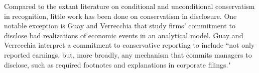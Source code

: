 \documentclass[letterpaper,12pt]{article}
\begin{document}
\begin{spacing}{1.5}
Compared to the extant literature on conditional and unconditional conservatism in recognition, little work has been done on conservatism in disclosure. One notable exception is Guay and Verrecchia \citeyear{guayConservativeDisclosure2018} that study firms' commitment to disclose bad realizations of economic events in an analytical model. Guay and Verrecchia \citeyear[p. 73]{guayConservativeDisclosure2018} interpret a commitment to conservative reporting to include ``not only reported earnings, but, more broadly, any mechanism that commits managers to disclose, such as required footnotes and explanations in corporate filings."
\begin{comment}
	As \citeA[p. 243]{kothariManagersWithholdBad2009} state:
	\begin{adjustwidth}{1cm}{1cm}
	\begin{singlespace}
	\textit{Considerable research examines conservative} recognition \textit{in accounting in the United States and internationally (Basu [1997], Ball, Kothari, and Robin [2000], McNichols [1988]). However, there is little systematic evidence to suggest conservatism in firms’} disclosure \textit{practices, with the notable exception of disclosure of bad news to mitigate litigation risk.}
	\end{singlespace}
	\end{adjustwidth}
	In a recent analytical work, \citeA[pp. 73-74]{guayConservativeDisclosure2018} have expressed similar opinions:
	\begin{adjustwidth}{1cm}{1cm}
	\begin{singlespace}
	\textit{By way of an analogy, 20 years ago, much of the accounting literature on transparent financial disclosure emphasized constructs such as earnings timeliness, high-quality accruals, and asset/liability recognition. Today, scholars study a plethora of additional financial disclosure mechanisms, including management forecasts, conference calls, management discussion and analysis (MD\&A) disclosure, press releases, and social media outlets. A commitment to timely disclosure of bad news need not come exclusively through financial statement recognition, and we believe that a broader view of conservative disclosure will offer new paths forward for a literature that has struggled to develop theories to explain the efficiency of timely asymmetric earnings numbers. We encourage researchers to pursue these avenues to better understand how the very large literature on conservative financial reporting integrates with the equally large literature on corporate disclosure.}
	\end{singlespace}
	\end{adjustwidth}
\end{comment}


\end{spacing}
\end{document}
